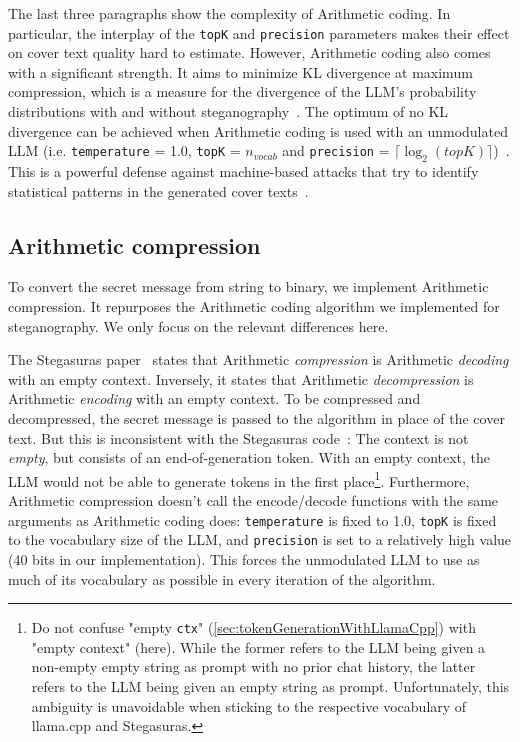 The last three paragraphs show the complexity of Arithmetic coding. In particular, the interplay of the \lstinline|topK| and \lstinline|precision| parameters makes their effect on cover text quality hard to estimate. However, Arithmetic coding also comes with a significant strength. It aims to minimize \gls{KL} divergence at maximum compression, which is a measure for the divergence of the \gls{LLM}'s probability distributions with and without steganography~\cite{zieglerNeuralLinguisticSteganography2019}. The optimum of no \gls{KL} divergence can be achieved when Arithmetic coding is used with an unmodulated \gls{LLM} (i.e. \lstinline|temperature| = 1.0, \lstinline|topK| = $n_{vocab}$ and \lstinline|precision| = $ \lceil \log_2(topK) \rceil $)~\cite{zieglerNeuralLinguisticSteganography2019}. This is a powerful defense against machine-based attacks that try to identify statistical patterns in the generated cover texts~\cite{zieglerNeuralLinguisticSteganography2019}.

\subsection{Arithmetic compression}
\label{sec:arithmeticCompression}
To convert the secret message from string to binary, we implement Arithmetic compression. It repurposes the Arithmetic coding algorithm we implemented for steganography. We only focus on the relevant differences here.

The Stegasuras paper~\cite{zieglerNeuralLinguisticSteganography2019} states that Arithmetic \textit{compression} is Arithmetic \textit{decoding} with an empty context. Inversely, it states that Arithmetic \textit{decompression} is Arithmetic \textit{encoding} with an empty context. To be compressed and decompressed, the secret message is passed to the algorithm in place of the cover text. But this is inconsistent with the Stegasuras code~\cite{zieglerHarvardnlpNeuralSteganography2025}: The context is not \textit{empty}, but consists of an end-of-generation token. With an empty context, the \gls{LLM} would not be able to generate tokens in the first place\footnote{Do not confuse "empty \lstinline|ctx|" (\cref{sec:tokenGenerationWithLlamaCpp}) with "empty context" (here). While the former refers to the \gls{LLM} being given a non-empty empty string as prompt with no prior chat history, the latter refers to the \gls{LLM} being given an empty string as prompt. Unfortunately, this ambiguity is unavoidable when sticking to the respective vocabulary of llama.cpp and Stegasuras.}. Furthermore, Arithmetic compression doesn't call the encode/decode functions with the same arguments as Arithmetic coding does: \lstinline|temperature| is fixed to 1.0, \lstinline|topK| is fixed to the vocabulary size of the \gls{LLM}, and \lstinline|precision| is set to a relatively high value (40 bits in our implementation). This forces the unmodulated \gls{LLM} to use as much of its vocabulary as possible in every iteration of the algorithm.

